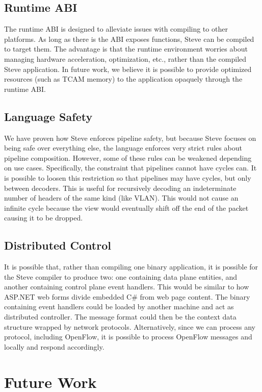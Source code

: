 \subsection{Runtime ABI}

The runtime ABI is designed to alleviate issues with compiling to other platforms.
As long as there is the ABI exposes functions, Steve can be compiled to target them. The advantage is that the runtime environment worries about managing hardware acceleration, optimization, etc., rather than the compiled Steve application. In future work, we believe it is possible to provide optimized resources (such as TCAM memory) to the application opaquely through the runtime ABI.

\subsection{Language Safety}

We have proven how Steve enforces pipeline safety, but
because Steve focuses on being safe over everything else, the language enforces very strict rules about pipeline composition. However, some of these rules can be weakened depending on use cases.
Specifically, the constraint that pipelines cannot have cycles can. It is possible to loosen this restriction so that pipelines may have cycles, but only between decoders. This is useful for recursively decoding an indeterminate number of headers of the same kind (like VLAN). This would not cause an infinite cycle because the view would eventually shift off the end of the packet causing it to be dropped.

\subsection{Distributed Control}

It is possible that, rather than compiling one binary application, it is possible for the Steve compiler to produce two: one containing data plane entities, and another containing control plane event handlers. This would be similar to how ASP.NET web forms divide embedded C\# from web page content. The binary containing event handlers could be loaded by another machine and act as distributed controller. The message format could then be the context data structure wrapped by network protocols. Alternatively, since we can process any protocol, including OpenFlow, it is possible to process OpenFlow messages and locally and respond accordingly.

\section{Future Work}

